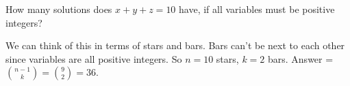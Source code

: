 \question How many solutions does $x + y + z = 10$ have, if all variables 
must be positive integers? 

\begin{solution}[.5 in]
We can think of this in terms of stars and bars. Bars can't be next to each 
other since variables are all positive integers. So $n = 10$ stars, 
$k = 2$ bars. Answer = ${n-1 \choose k} = {9 \choose 2} = 36$.
\end{solution}